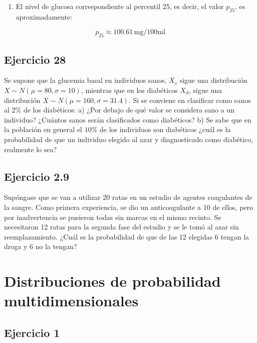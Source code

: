 \documentclass[
]{article}
\providecommand{\tightlist}{%
  \setlength{\itemsep}{0pt}\setlength{\parskip}{0pt}}
\begin{document}
\begin{enumerate}
\def\labelenumi{\arabic{enumi}.}
\setcounter{enumi}{2}
\tightlist
\item
  El nivel de glucosa correspondiente al percentil 25, es decir, el valor \(p_{25}\), es aproximadamente:
\end{enumerate}

\[ p_{25} \approx 100.61 \, \mathrm{mg/100ml} \]

\subsection{Ejercicio 28}\label{ejercicio-28}

Se supone que la glucemia basal en individuos sanos, \(X_{s}\) sigue una distribución \(X \sim N(\mu=80, \sigma=10)\), mientras que en los diabéticos \(X_{d}\), sigue una distribución \(X \sim N(\mu=160, \sigma=31.4)\). Si se conviene en clasificar como sanos al \(2 \%\) de los diabéticos:
a) ¿Por debajo de qué valor se considera sano a un individuo? ¿Cuántos sanos serán clasificados como diabéticos?
b) Se sabe que en la población en general el \(10 \%\) de los individuos son diabéticos ¿cuál es la probabilidad de que un individuo elegido al azar y diagnosticado como diabético, realmente lo sea?

\subsection{Ejercicio 2.9}\label{ejercicio-2.9}

Supóngase que se van a utilizar 20 ratas en un estudio de agentes coagulantes de la sangre. Como primera experiencia, se dio un anticoagulante a 10 de ellos, pero por inadvertencia se pusieron todas sin marcas en el mismo recinto. Se necesitaron 12 ratas para la segunda fase del estudio y se le tomó al azar sin reemplazamiento. ¿Cuál es la probabilidad de que de las 12 elegidas 6 tengan la droga y 6 no la tengan?

\section{Distribuciones de probabilidad multidimensionales}\label{distribuciones-de-probabilidad-multidimensionales}

\subsection{Ejercicio 1}\label{ejercicio-1}
\end{document}
